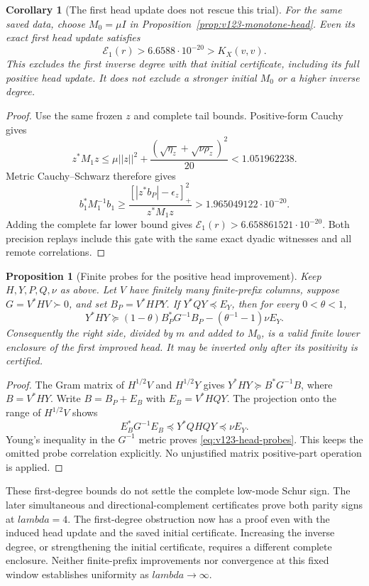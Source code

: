 \documentclass[11pt]{article}
\def\lambda{lambda}%
\def\norm#1{||#1||}%
\newtheorem{proposition}[theorem]{Proposition}
\newtheorem{corollary}[theorem]{Corollary}
\theoremstyle{remark}
\newcommand{\norm}[1]{\left\lVert #1\right\rVert}
\begin{document}
\begin{corollary}[The first head update does not rescue this trial]
\label{cor:v123-updated-first-fails}
For the same saved data, choose $M_0=\mu I$ in
Proposition~\ref{prop:v123-monotone-head}. Even its exact first
head update satisfies
\[
 \mathcal E_1(r)>6.6588\cdot10^{-20}>K_X(v,v).
\]
This excludes the first inverse degree with that initial certificate,
including its full positive head update. It does not exclude a
stronger initial $M_0$ or a higher inverse degree.
\end{corollary}
\begin{proof}
Use the same frozen $z$ and complete tail bounds. Positive-form
Cauchy gives
\[
 z^*M_1z\le\mu\norm z^2+
 \frac{(\sqrt{\eta_z}+\sqrt{\nu\rho_z})^2}{20}
       <1.051962238.
\]
Metric Cauchy--Schwarz therefore gives
\[
 b_1^*M_1^{-1}b_1
 \ge\frac{[|z^*b_P|-\epsilon_z]_+^2}{z^*M_1z}
       >1.965049122\cdot10^{-20}.
\]
Adding the complete far lower bound gives
$\mathcal E_1(r)>6.658861521\cdot10^{-20}$.
Both precision replays include this gate with the same exact
dyadic witnesses and all remote correlations.
\end{proof}

\begin{proposition}[Finite probes for the positive head improvement]
\label{prop:v123-head-probes}
Keep $H,Y,P,Q,\nu$ as above. Let $V$ have finitely many
finite-prefix columns, suppose $G=V^*HV\succ0$, and set
$B_P=V^*HPY$. If $Y^*QY\preceq E_Y$, then for every
$0<\theta<1$,
\begin{equation}\label{eq:v123-head-probes}
 Y^*HY\succeq
 (1-\theta)B_P^*G^{-1}B_P
       -(\theta^{-1}-1)\nu E_Y.
\end{equation}
Consequently the right side, divided by $m$ and added to $M_0$,
is a valid finite lower enclosure of the first improved head.
It may be inverted only after its positivity is certified.
\end{proposition}
\begin{proof}
The Gram matrix of $H^{1/2}V$ and $H^{1/2}Y$ gives
$Y^*HY\succeq B^*G^{-1}B$, where $B=V^*HY$.
Write $B=B_P+E_B$ with $E_B=V^*HQY$.
The projection onto the range of $H^{1/2}V$ shows
\[
 E_B^*G^{-1}E_B\preceq Y^*QHQY\preceq\nu E_Y.
\]
Young's inequality in the $G^{-1}$ metric proves
\eqref{eq:v123-head-probes}. This keeps the omitted probe
correlation explicitly. No unjustified matrix positive-part
operation is applied.
\end{proof}

These first-degree bounds do not settle the complete low-mode Schur
sign. The later simultaneous and directional-complement certificates
prove both parity signs at $\lambda=4$.
The first-degree obstruction now has a proof even with the
induced head update and the saved initial certificate. Increasing
the inverse degree, or strengthening the initial certificate,
requires a different complete enclosure.
Neither finite-prefix improvements nor convergence at this fixed
window establishes uniformity as $\lambda\to\infty$.
\end{document}
